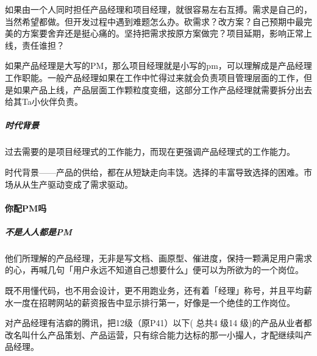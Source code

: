 \documentclass[letterpaper,10pt,english]{sphinxmanual}
\begin{document}
如果由一个人同时担任产品经理和项目经理，就很容易左右互搏。需求是自己的，当然希望都做。但开发过程中遇到难题怎么办。砍需求？改方案？自己预期中最完美的方案要舍弃还是挺心痛的。坚持把需求按原方案做完？项目延期，影响正常上线，责任谁担？

如果产品经理是大写的PM，那么项目经理就是小写的pm，可以理解成是产品经理工作职能。一般产品经理如果在工作中忙得过来就会负责项目管理层面的工作，但是如果产品上线，产品层面工作颗粒度变细，这部分工作产品经理就需要拆分出去给其Ta小伙伴负责。%
\begin{footnote}[169]\sphinxAtStartFootnote
{}
%
\end{footnote}


\subparagraph{时代背景}
\label{\detokenize{chapter_introduction/PM:id7}}
过去需要的是项目经理式的工作能力，而现在更强调产品经理式的工作能力。

时代背景——产品的供给，都在从短缺走向丰饶。选择的丰富导致选择的困难。市场从从生产驱动变成了需求驱动。


\paragraph{你配PM吗}
\label{\detokenize{chapter_introduction/PM:pm}}

\subparagraph{不是人人都是PM}
\label{\detokenize{chapter_introduction/PM:id8}}
他们所理解的产品经理，无非是写文档、画原型、催进度，保持一颗满足用户需求的心，再喊几句「用户永远不知道自己想要什么」便可以为所欲为的一个岗位。

既不用懂代码，也不用会设计，更不用跑业务，还有着「经理」称号，并且平均薪水一度在招聘网站的薪资报告中显示排行第一，好像是一个绝佳的工作岗位。%
\begin{footnote}[170]\sphinxAtStartFootnote
{}
%
\end{footnote}

对产品经理有洁癖的腾讯，把12级（原P4\sphinxhyphen{}1）以下( 总共4 级\sphinxhyphen{}14
级)的产品从业者都改名叫什么产品策划、产品运营，只有综合能力达标的那一小撮人，才配继续叫产品经理。%
\begin{footnote}[171]\sphinxAtStartFootnote
{}
%
\end{footnote}
\end{document}
